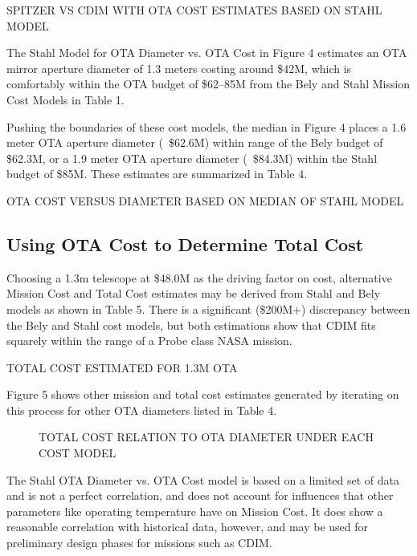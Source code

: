 \documentclass{ws-jai}
\begin{document}
\begin{table}
  \caption{SPITZER VS CDIM WITH OTA COST ESTIMATES BASED ON STAHL MODEL
\label{tab:cost-spitzer-vs-CDIM}
}
\end{table}

The Stahl Model for OTA Diameter vs. OTA Cost in Figure 4 estimates an OTA mirror aperture diameter of 1.3 meters costing around \$42M, which is comfortably within the OTA budget of \$62--85M from the Bely and Stahl Mission Cost Models in Table 1.

Pushing the boundaries of these cost models, the median in Figure 4 places a 1.6 meter OTA aperture diameter (~\$62.6M) within range of the Bely budget of \$62.3M, or a 1.9 meter OTA aperture diameter (~\$84.3M) within the Stahl budget of \$85M.
These estimates are summarized in Table 4.

\begin{table}
  \caption{OTA COST VERSUS DIAMETER BASED ON MEDIAN OF STAHL MODEL
\label{tab:cost-ota-vs-dia-CDIM}
}
\end{table}

\subsection{Using OTA Cost to Determine Total Cost}
Choosing a 1.3m telescope at \$48.0M as the driving factor on cost, alternative Mission Cost and Total Cost estimates may be derived from Stahl and Bely models as shown in Table 5.
There is a significant (\$200M+) discrepancy between the Bely and Stahl cost models, but both estimations show that CDIM fits squarely within the range of a Probe class NASA mission.

\begin{table}
  \caption{TOTAL COST ESTIMATED FOR 1.3M OTA
\label{tab:cost-tota-1.3m}
}
\end{table}

Figure 5 shows other mission and total cost estimates generated by iterating on this process for other OTA diameters listed in Table 4.

\begin{figure}
  \caption{TOTAL COST RELATION TO OTA DIAMETER UNDER EACH COST MODEL
\label{fig:cost-total-compare-models}
}
\end{figure}

The Stahl OTA Diameter vs. OTA Cost model is based on a limited set of data and is not a perfect correlation, and does not account for influences that other parameters like operating temperature have on Mission Cost.
It does show a reasonable correlation with historical data, however, and may be used for preliminary design phases for missions such as CDIM.\@
\end{document}
